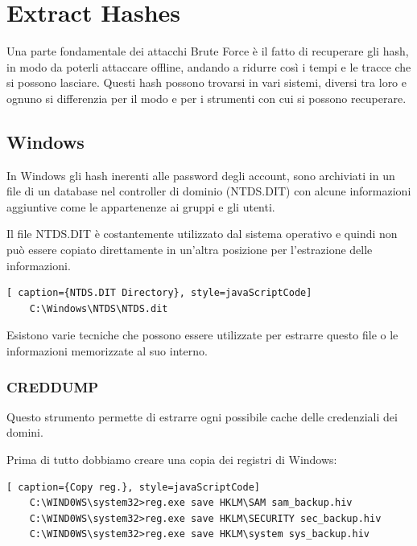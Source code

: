 \chapter{Extract Hashes}
Una parte fondamentale dei attacchi Brute Force è il fatto di recuperare gli hash, in modo da poterli attaccare offline, andando a ridurre così i tempi e le tracce che si possono lasciare.
Questi hash possono trovarsi in vari sistemi, diversi tra loro e ognuno si differenzia per il modo e per i strumenti con cui si possono recuperare.
\section{Windows}
In Windows gli hash inerenti alle password degli account, sono archiviati in un file di un database nel controller di dominio (NTDS.DIT) con alcune informazioni aggiuntive come le appartenenze ai gruppi e gli utenti.

Il file NTDS.DIT è costantemente utilizzato dal sistema operativo e quindi non può essere copiato direttamente in un'altra posizione per l'estrazione delle informazioni.
\begin{lstlisting}[ caption={NTDS.DIT Directory}, style=javaScriptCode]
    C:\Windows\NTDS\NTDS.dit
\end{lstlisting}

Esistono varie tecniche che possono essere utilizzate per estrarre questo file o le informazioni memorizzate al suo interno.

\subsection{CREDDUMP}

Questo strumento\cite{CREDDUMP} permette di estrarre ogni possibile cache delle credenziali dei domini.

Prima di tutto dobbiamo creare una copia dei registri di Windows:

\begin{lstlisting}[ caption={Copy reg.}, style=javaScriptCode]
    C:\WIND0WS\system32>reg.exe save HKLM\SAM sam_backup.hiv
    C:\WIND0WS\system32>reg.exe save HKLM\SECURITY sec_backup.hiv
    C:\WIND0WS\system32>reg.exe save HKLM\system sys_backup.hiv
    \end{lstlisting}


